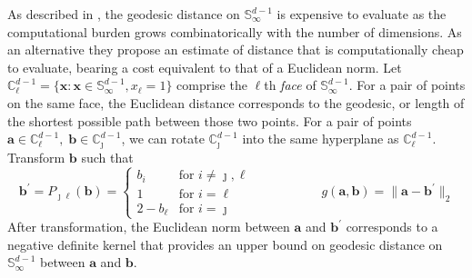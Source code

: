 As described in \cite{trubey:pg}, the  geodesic distance on 
    $\mathbb{S}_{\infty}^{d-1}$ 
    is expensive to evaluate as the computational burden grows 
    combinatorically with the number of dimensions.  As an alternative they propose an 
    estimate of distance that is computationally cheap to evaluate, bearing 
    a cost equivalent to that of a Euclidean norm.
    Let
    ${\mathbb C}_{\ell}^{d-1} = \lbrace \bm{x} : 
        \bm{x} \in {\mathbb S}_{\infty}^{d-1}, x_{\ell} = 1\rbrace$
    comprise the $\ell$th \emph{face} of $\mathbb{S}_{\infty}^{d-1}$.  For a 
    pair of points on the same face, the Euclidean distance corresponds to the
    geodesic, or length of the shortest possible path between those two points.  
    For a pair of points 
    $\bm{a} \in \mathbb{C}_{\ell}^{d-1},\;\bm{b}\in\mathbb{C}_{\jmath}^{d-1}$,
    we can rotate $\mathbb{C}_{\jmath}^{d-1}$ into the same hyperplane as 
    $\mathbb{C}_{\ell}^{d-1}$.  Transform $\bm{b}$ such that %
    \begin{equation}
        \label{eqn:rotation}
        \bm{b}^{\prime} = P_{\jmath\ell}(\bm{b}) = 
        \begin{cases}
            b_{i} &\text{for }i\neq \jmath,\ell\\
            1 &\text{for }i = \ell\\
            2 - b_{\ell} &\text{for }i = \jmath
        \end{cases}\;\hspace{2cm}\;
        g(\bm{a},\bm{b}) = \lVert \bm{a} - \bm{b}^{\prime}\rVert_2
    \end{equation}
    After transformation, the Euclidean norm between $\bm{a}$ and 
    $\bm{b}^{\prime}$ corresponds to a negative definite kernel that
    provides an upper bound on geodesic distance on 
    $\mathbb{S}_{\infty}^{d-1}$ between $\bm{a}$ and $\bm{b}$.


